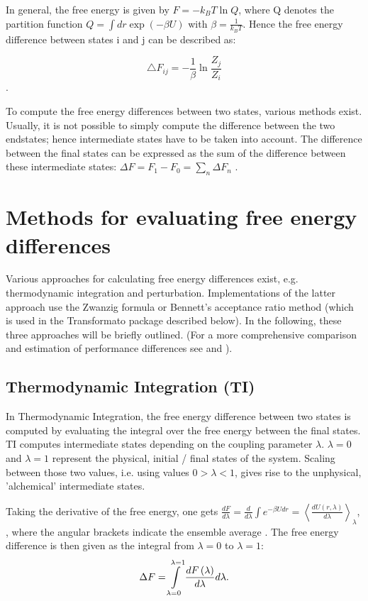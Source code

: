 In general, the free energy is given by $F=-k_{B}T\ln Q$, where Q denotes the partition function $Q=\int dr\exp\left(-\beta U\right)$
with $\beta=\frac{1}{k_{B}T}$. Hence the free energy difference between
states i and j can be described as:

\[
\bigtriangleup F_{ij}=-\frac{1}{\beta}\ln\frac{Z_{j}}{Z_{i}}
\] \cite{Shirts.2013}. 

To compute the free energy differences between two states, various
methods exist. Usually, it is not possible to simply compute the difference
between the two endstates; hence intermediate states have to be taken
into account. The difference between the final states can be expressed
as the sum of the difference between these intermediate states: $\Delta F=F_{1}-F_{0}=\sum_{n}\Delta F_{n}$
\cite{Mey.2020}.

\section{Methods for evaluating free energy differences}

Various approaches for calculating free energy differences exist,
e.g. thermodynamic integration and perturbation. Implementations of the latter approach use
the Zwanzig formula or Bennett's acceptance ratio method (which is
used in the Transformato package described below). In the following,
these three approaches will be briefly outlined. (For a more
comprehensive comparison and estimation of performance differences
see \cite{Bruckner.2011} and \cite{Ruiter.2013}).

\subsection{Thermodynamic Integration (TI)}

In Thermodynamic Integration, the free energy difference between two
states is computed by evaluating the integral over the free energy
between the final states. TI computes intermediate
states depending on the coupling parameter $\lambda$. $\lambda=0$
and $\lambda=1$ represent the physical, initial / final states of
the system. Scaling between those two values, i.e. using values $0>\lambda<1$,
gives rise to the unphysical, 'alchemical' intermediate states.

Taking the derivative of the free energy, one gets $\frac{dF}{d\lambda}=\frac{d}{d\lambda}\int e^{-\beta U dr}=\left\langle \frac{dU\left(r,\lambda\right)}{d\lambda}\right\rangle _{\lambda}$\cite{Shirts.2013}, 
, where the angular brackets indicate the ensemble average .
The free energy difference is then given as the integral from $\lambda=0$ to $\lambda=1$:
\[
\Delta F=\intop_{\lambda=0}^{\lambda=1}\frac{dF\left(\lambda\right)}{d\lambda}d\lambda.
\]

